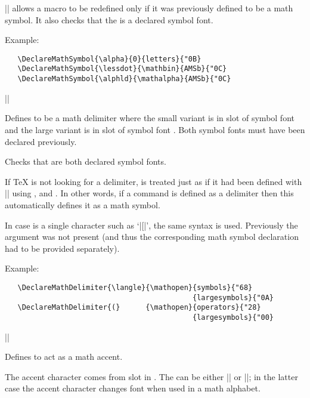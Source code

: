 \documentclass{ltxguide}[1995/11/28]
\begin{document}
|\DeclareMathSymbol| allows a macro  to be redefined only if
it was previously defined to be a math symbol.  It also checks that the
 is a declared symbol font.

Example:
\begin{verbatim}
   \DeclareMathSymbol{\alpha}{0}{letters}{"0B}
   \DeclareMathSymbol{\lessdot}{\mathbin}{AMSb}{"0C}
   \DeclareMathSymbol{\alphld}{\mathalpha}{AMSb}{"0C}
\end{verbatim}


\begin{decl}
  |\DeclareMathDelimiter|  
                           \\
              \null\hfill {} 
\end{decl}
Defines  to be a math delimiter where the small variant is in
slot  of symbol font  and the large variant is
in slot  of symbol font .  Both symbol fonts
must have been declared previously.

Checks that  are both declared symbol fonts.

If \TeX{} is not looking for a delimiter,  is treated just as if
it had been defined with |\DeclareMathSymbol| using ,
 and .  In other words, if a command is defined
as a delimiter then this automatically defines it as a math symbol.

In case  is a single character such as `|[|', the same syntax is
used.  Previously the  argument was not present (and thus the
corresponding math symbol declaration had to be provided separately).

Example:
\begin{verbatim}
   \DeclareMathDelimiter{\langle}{\mathopen}{symbols}{"68}
                                            {largesymbols}{"0A}
   \DeclareMathDelimiter{(}      {\mathopen}{operators}{"28}
                                            {largesymbols}{"00}
\end{verbatim}


\begin{decl}
  |\DeclareMathAccent|    
\end{decl}

Defines  to act as a math accent.

The accent character comes from slot  in . The
 can be either |\mathord| or |\mathalpha|; in the latter case
the accent character changes font when used in a math alphabet.
\end{document}
